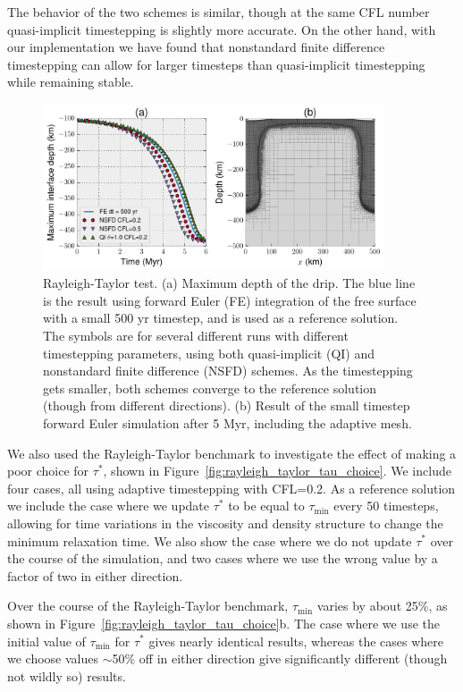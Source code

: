 \documentclass[preprint,12pt,authoryear]{elsarticle}
\begin{document}
The behavior of the two schemes is similar, though at the same CFL number quasi-implicit timestepping is slightly more accurate.
On the other hand, with our implementation we have found that nonstandard finite difference timestepping can allow for larger timesteps 
than quasi-implicit timestepping while remaining stable.

\begin{figure}
\includegraphics[width=0.9\textwidth]{figures/rayleigh_taylor.pdf}
\caption[Results of the Rayleigh-Taylor test.]{Rayleigh-Taylor test. (a) Maximum depth of the drip. The blue line is the result using forward Euler (FE) integration of the free surface with a small 500 yr timestep, and is used as a reference solution. The symbols are for several different runs with different timestepping parameters, using both quasi-implicit (QI) and nonstandard finite difference (NSFD) schemes. As the timestepping gets smaller, both schemes converge to the reference solution (though from different directions). (b) Result of the small timestep forward Euler simulation after 5 Myr, including the adaptive mesh.}
\label{fig:rayleigh_taylor}
\end{figure}

We also used the Rayleigh-Taylor benchmark to investigate the effect of making a poor choice for $\tau^*$, shown in Figure~\ref{fig:rayleigh_taylor_tau_choice}.
We include four cases, all using adaptive timestepping with CFL=0.2.
As a reference solution we include the case where we update $\tau^*$ to be equal to $\tau_\mathrm{min}$ every 50 timesteps,
allowing for time variations in the viscosity and density structure to change the minimum relaxation time.
We also show the case where we do not update $\tau^*$ over the course of the simulation, and two cases where
we use the wrong value by a factor of two in either direction.

Over the course of the Rayleigh-Taylor benchmark, $\tau_\mathrm{min}$ varies by about 25\%, as shown in Figure~\ref{fig:rayleigh_taylor_tau_choice}b.
The case where we use the initial value of $\tau_\mathrm{min}$ for $\tau^*$ gives nearly identical results,
whereas the cases where we choose values $\sim$50\% off in either direction give significantly different (though not wildly so) results.
\end{document}
